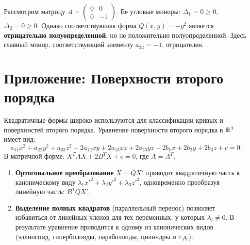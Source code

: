 \documentclass[12pt]{article}
\begin{document}
\begin{example}[Контрпример]
Рассмотрим матрицу $A = \begin{pmatrix} 0 & 0 \\ 0 & -1 \end{pmatrix}$. Ее угловые миноры: $\Delta_1 = 0 \ge 0$, $\Delta_2 = 0 \ge 0$. Однако соответствующая форма $Q(x,y) = -y^2$ является \textbf{отрицательно полуопределенной}, но не положительно полуопределенной. Здесь главный минор, соответствующий элементу $a_{22} = -1$, отрицателен.
\end{example}

\section*{Приложение: Поверхности второго порядка}
Квадратичные формы широко используются для классификации кривых и поверхностей второго порядка. Уравнение поверхности второго порядка в $\mathbb{R}^3$ имеет вид:
\[
a_{11}x^2 + a_{22}y^2 + a_{33}z^2 + 2a_{12}xy + 2a_{13}xz + 2a_{23}yz + 2b_1x + 2b_2y + 2b_3z + c = 0.
\]
В матричной форме: $X^T A X + 2B^T X + c = 0$, где $A = A^T$.

\begin{enumerate}
    \item \textbf{Ортогональное преобразование} $X = QX'$ приводит квадратичную часть к каноническому виду $\lambda_1 x'^2 + \lambda_2 y'^2 + \lambda_3 z'^2$, одновременно преобразуя линейную часть: $B^T Q X'$.
    \item \textbf{Выделение полных квадратов} (параллельный перенос) позволяет избавиться от линейных членов для тех переменных, у которых $\lambda_i \neq 0$. В результате уравнение приводится к одному из канонических видов (эллипсоид, гиперболоиды, параболоиды, цилиндры и т.д.).
\end{enumerate}
\end{document}
